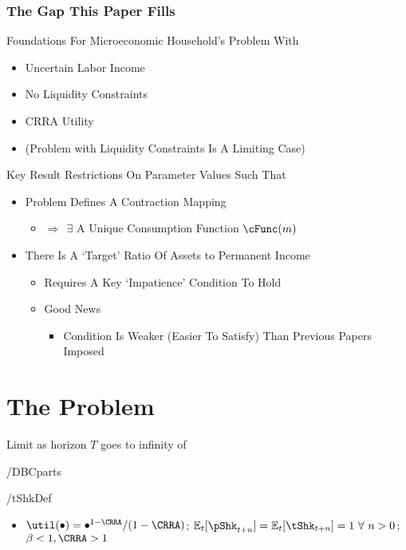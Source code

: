 \documentclass[pdflatex]{beamer}\providecommand{\texname}{BufferStockTheory-Slides}%
\providecommand{\Ex}{\mathbb{E}}
\begin{document}
\begin{frame}
\frametitle{The Gap This Paper Fills}

\pause Foundations For Microeconomic Household's Problem With
\begin{itemize}
\item Uncertain Labor Income
\item No Liquidity Constraints
\item CRRA Utility
\item (Problem with Liquidity Constraints Is A Limiting Case)
\end{itemize}

\end{frame}
\begin{frame}{Key Result}
\pause
Restrictions On Parameter Values Such That \pause
\begin{itemize}
\item Problem Defines A Contraction Mapping
\begin{itemize}
\item $\Rightarrow~~\exists $ A Unique Consumption Function $\cFunc(m)$
\end{itemize}
\item There Is A `Target' Ratio Of Assets to Permanent Income
\begin{itemize}
\item Requires A Key `Impatience' Condition To Hold
\item Good News
\begin{itemize} \item Condition Is Weaker (Easier To Satisfy) Than Previous Papers Imposed \end{itemize}
\end{itemize}
\end{itemize}

\end{frame}

\section{The Problem}

\begin{frame}

Limit as horizon $T$ goes to infinity of 

 \LtxDir\EqDir/DBCparts

 \LtxDir\EqDir/tShkDef

\begin{itemize}
\item $\util(\bullet)=\bullet^{1-\CRRA}/(1-\CRRA)$; $\Ex_{t}[\pShk_{t+n}]=\Ex_{t}[\tShk_{t+n}]=1~\forall~n>0$; $\beta < 1, \CRRA > 1$
\end{itemize}

\end{frame}
\end{document}
